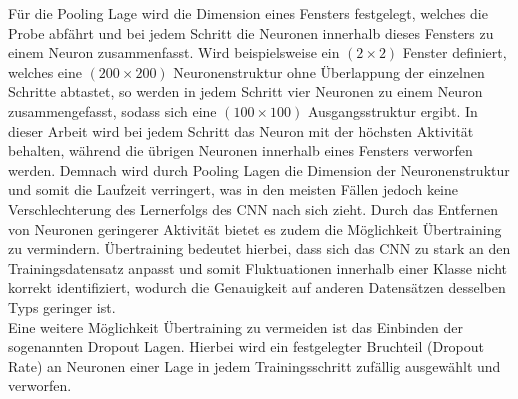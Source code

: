 Für die Pooling Lage wird die Dimension eines Fensters festgelegt, welches die Probe abfährt und bei jedem Schritt die Neuronen innerhalb dieses Fensters zu einem Neuron zusammenfasst. Wird beispielsweise ein $(2\times 2)$ Fenster definiert, welches eine $(200 \times 200)$ Neuronenstruktur ohne Überlappung der einzelnen Schritte abtastet, so werden in jedem Schritt vier Neuronen zu einem Neuron zusammengefasst, sodass sich eine $(100\times 100)$ Ausgangsstruktur ergibt. In dieser Arbeit wird bei jedem Schritt das Neuron mit der höchsten Aktivität behalten, während die übrigen Neuronen innerhalb eines Fensters verworfen werden. Demnach wird durch Pooling Lagen die Dimension der Neuronenstruktur und somit die Laufzeit verringert, was in den meisten Fällen jedoch keine Verschlechterung des Lernerfolgs des CNN nach sich zieht. Durch das Entfernen von Neuronen geringerer Aktivität bietet es zudem die Möglichkeit Übertraining zu vermindern. Übertraining bedeutet hierbei, dass sich das CNN zu stark an den Trainingsdatensatz anpasst und somit Fluktuationen innerhalb einer Klasse nicht korrekt identifiziert, wodurch die Genauigkeit auf anderen Datensätzen desselben Typs geringer ist. \\
Eine weitere Möglichkeit Übertraining zu vermeiden ist das Einbinden der sogenannten Dropout Lagen. Hierbei wird ein festgelegter Bruchteil (Dropout Rate) an Neuronen einer Lage in jedem Trainingsschritt zufällig ausgewählt und verworfen. \\
\captionsetup[table]{name=Abbildung}
